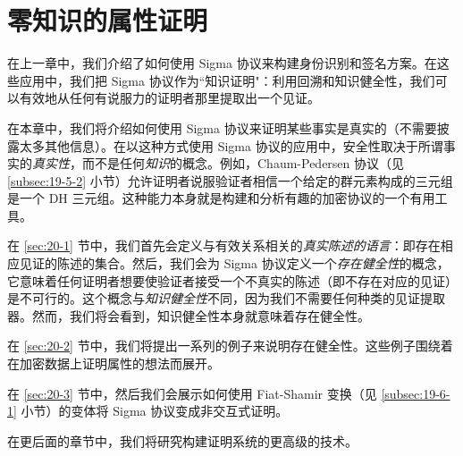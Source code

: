 \chapter{零知识的属性证明}\label{chap:20}

在上一章中，我们介绍了如何使用 Sigma 协议来构建身份识别和签名方案。在这些应用中，我们把 Sigma 协议作为``知识证明"：利用回溯和知识健全性，我们可以有效地从任何有说服力的证明者那里提取出一个见证。

在本章中，我们将介绍如何使用 Sigma 协议来证明某些事实是真实的（不需要披露太多其他信息）。在以这种方式使用 Sigma 协议的应用中，安全性取决于所谓事实的\emph{真实性}，而不是任何\emph{知识}的概念。例如，Chaum-Pedersen 协议（见 \ref{subsec:19-5-2} 小节）允许证明者说服验证者相信一个给定的群元素构成的三元组是一个 DH 三元组。这种能力本身就是构建和分析有趣的加密协议的一个有用工具。

在 \ref{sec:20-1} 节中，我们首先会定义与有效关系相关的\emph{真实陈述的语言}：即存在相应见证的陈述的集合。然后，我们会为 Sigma 协议定义一个\emph{存在健全性}的概念，它意味着任何证明者想要使验证者接受一个不真实的陈述（即不存在对应的见证）是不可行的。这个概念与\emph{知识健全性}不同，因为我们不需要任何种类的见证提取器。然而，我们将会看到，知识健全性本身就意味着存在健全性。

在 \ref{sec:20-2} 节中，我们将提出一系列的例子来说明存在健全性。这些例子围绕着在加密数据上证明属性的想法而展开。

在 \ref{sec:20-3} 节中，然后我们会展示如何使用 Fiat-Shamir 变换（见 \ref{subsec:19-6-1} 小节）的变体将 Sigma 协议变成非交互式证明。

在更后面的章节中，我们将研究构建证明系统的更高级的技术。









